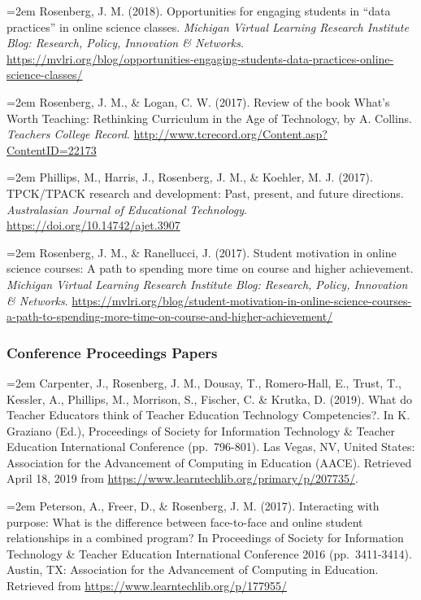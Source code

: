 \documentclass[14,]{article}
\begin{document}
\hangindent=2em Rosenberg, J. M. (2018). Opportunities for engaging
students in ``data practices'' in online science classes. \emph{Michigan
Virtual Learning Research Institute Blog: Research, Policy, Innovation
\& Networks}.
\url{https://mvlri.org/blog/opportunities-engaging-students-data-practices-online-science-classes/}

\hangindent=2em Rosenberg, J. M., \& Logan, C. W. (2017). Review of the
book What's Worth Teaching: Rethinking Curriculum in the Age of
Technology, by A. Collins. \emph{Teachers College Record}.
\url{http://www.tcrecord.org/Content.asp?ContentID=22173}

\hangindent=2em Phillips, M., Harris, J., Rosenberg, J. M., \& Koehler,
M. J. (2017). TPCK/TPACK research and development: Past, present, and
future directions. \emph{Australasian Journal of Educational
Technology}. \url{https://doi.org/10.14742/ajet.3907}

\hangindent=2em Rosenberg, J. M., \& Ranellucci, J. (2017). Student
motivation in online science courses: A path to spending more time on
course and higher achievement. \emph{Michigan Virtual Learning Research
Institute Blog: Research, Policy, Innovation \& Networks}.
\url{https://mvlri.org/blog/student-motivation-in-online-science-courses-a-path-to-spending-more-time-on-course-and-higher-achievement/}

\subsubsection{Conference Proceedings
Papers}\label{conference-proceedings-papers}

\hangindent=2em Carpenter, J., Rosenberg, J. M., Dousay, T.,
Romero-Hall, E., Trust, T., Kessler, A., Phillips, M., Morrison, S.,
Fischer, C. \& Krutka, D. (2019). What do Teacher Educators think of
Teacher Education Technology Competencies?. In K. Graziano (Ed.),
Proceedings of Society for Information Technology \& Teacher Education
International Conference (pp.~796-801). Las Vegas, NV, United States:
Association for the Advancement of Computing in Education (AACE).
Retrieved April 18, 2019 from
\url{https://www.learntechlib.org/primary/p/207735/}.

\hangindent=2em Peterson, A., Freer, D., \& Rosenberg, J. M. (2017).
Interacting with purpose: What is the difference between face-to-face
and online student relationships in a combined program? In Proceedings
of Society for Information Technology \& Teacher Education International
Conference 2016 (pp.~3411-3414). Austin, TX: Association for the
Advancement of Computing in Education. Retrieved from
\url{https://www.learntechlib.org/p/177955/}
\end{document}
